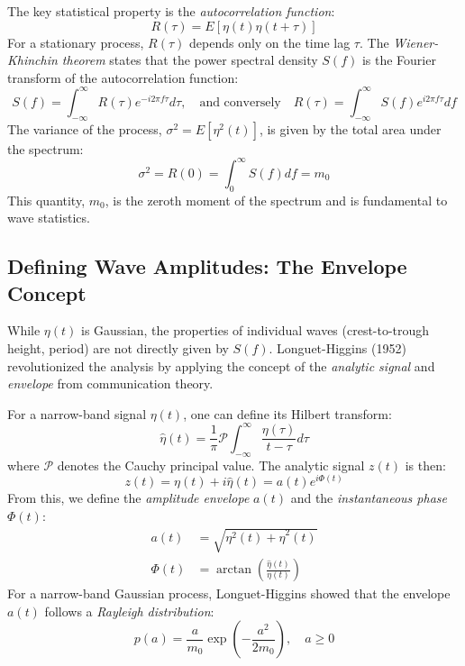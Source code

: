 \documentclass[11pt,letterpaper]{article}
\begin{document}
The key statistical property is the \textit{autocorrelation function}:
\begin{equation}
R(\tau) = E[\eta(t)\eta(t+\tau)]
\end{equation}
For a stationary process, $R(\tau)$ depends only on the time lag $\tau$. The \textit{Wiener-Khinchin theorem} states that the power spectral density $S(f)$ is the Fourier transform of the autocorrelation function:
\begin{equation}
S(f) = \int_{-\infty}^{\infty} R(\tau) e^{-i2\pi f\tau}  d\tau, \quad \text{and conversely} \quad R(\tau) = \int_{-\infty}^{\infty} S(f) e^{i2\pi f\tau}  df
\end{equation}
The variance of the process, $\sigma^2 = E[\eta^2(t)]$, is given by the total area under the spectrum:
\begin{equation}
\sigma^2 = R(0) = \int_{0}^{\infty} S(f)  df = m_0
\end{equation}
This quantity, $m_0$, is the zeroth moment of the spectrum and is fundamental to wave statistics.

\subsection{Defining Wave Amplitudes: The Envelope Concept}
\label{sec:envelope}
While $\eta(t)$ is Gaussian, the properties of individual waves (crest-to-trough height, period) are not directly given by $S(f)$. Longuet-Higgins (1952) revolutionized the analysis by applying the concept of the \textit{analytic signal} and \textit{envelope} from communication theory.

For a narrow-band signal $\eta(t)$, one can define its Hilbert transform:
\begin{equation}
\hat{\eta}(t) = \frac{1}{\pi} \mathcal{P} \int_{-\infty}^{\infty} \frac{\eta(\tau)}{t - \tau}  d\tau
\end{equation}
where $\mathcal{P}$ denotes the Cauchy principal value. The analytic signal $z(t)$ is then:
\begin{equation}
z(t) = \eta(t) + i\hat{\eta}(t) = a(t)e^{i\Phi(t)}
\end{equation}
From this, we define the \textit{amplitude envelope} $a(t)$ and the \textit{instantaneous phase} $\Phi(t)$:
\begin{align}
a(t) &= \sqrt{\eta^2(t) + \hat{\eta}^2(t)} \\
\Phi(t) &= \arctan\left(\frac{\hat{\eta}(t)}{\eta(t)}\right)
\end{align}
For a narrow-band Gaussian process, Longuet-Higgins showed that the envelope $a(t)$ follows a \textit{Rayleigh distribution}:
\begin{equation}
p(a) = \frac{a}{m_0} \exp\left( -\frac{a^2}{2m_0} \right), \quad a \geq 0
\end{equation}
\end{document}

